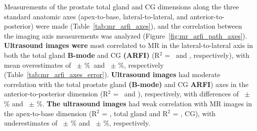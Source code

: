 Measurements of the prostate total gland and CG dimensions along the three
standard anatomic axes (apex-to-base, lateral-to-lateral, and
anterior-to-posterior) were made (Table~\ref{tab:mr_arfi_axes}), and the
correlation between the imaging axis measurements was analyzed
(Figure~\ref{fig:mr_arfi_path_axes}). \textbf{Ultrasound images were} most
correlated to MR in the lateral-to-lateral axis in both the total gland
\textbf{B-mode} and CG \textbf{(ARFI)} (R$^2$ = \totalLatLatRsq~and
\centralLatLatRsq, respectively), with mean overestimates of
\ARFImrTotalLatLatMeanPct~$\pm$ \ARFImrTotalLatLatStdPct\%~and
\ARFImrCentralLatLatMeanPct~$\pm$ \ARFImrCentralLatLatStdPct\%, respectively
(Table~\ref{tab:mr_arfi_axes_error}).  \textbf{Ultrasound images} had moderate
correlation with the total prostate gland \textbf{(B-mode)} and CG
\textbf{ARFI}) axes in the anterior-to-posterior dimension (R$^2$ =
\totalAntPostRsq~and \centralAntPostRsq), respectively, with differences of
\ARFImrTotalAntPostMeanPct~$\pm$ \ARFImrTotalAntPostStdPct\% and
\ARFImrCentralAntPostMeanPct~$\pm$ \ARFImrCentralAntPostStdPct\%.  \textbf{The
ultrasound images} had weak correlation with MR images in the apex-to-base
dimension (R$^2$ = \totalApexBaseRsq, total gland and R$^2$ =
\centralApexBaseRsq, CG), with underestimates of
\ARFImrTotalApexBaseMeanPct~$\pm$ \ARFImrTotalApexBaseStdPct\% and
\ARFImrCentralApexBaseMeanPct~$\pm$ \ARFImrCentralApexBaseStdPct\%,
respectively.





%

%

%
